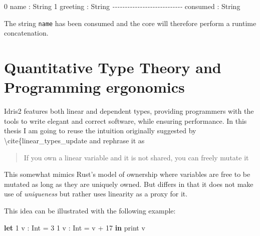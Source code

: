 \documentclass[
]{article}
\newenvironment{Shaded}{}{}
\newcommand{\CommentTok}[1]{\textcolor[rgb]{0.38,0.63,0.69}{\textit{#1}}}
\newcommand{\DataTypeTok}[1]{\textcolor[rgb]{0.56,0.13,0.00}{#1}}
\newcommand{\DecValTok}[1]{\textcolor[rgb]{0.25,0.63,0.44}{#1}}
\newcommand{\FunctionTok}[1]{\textcolor[rgb]{0.02,0.16,0.49}{#1}}
\newcommand{\KeywordTok}[1]{\textcolor[rgb]{0.00,0.44,0.13}{\textbf{#1}}}
\newcommand{\NormalTok}[1]{#1}
\newcommand{\OperatorTok}[1]{\textcolor[rgb]{0.40,0.40,0.40}{#1}}
\newcommand{\OtherTok}[1]{\textcolor[rgb]{0.00,0.44,0.13}{#1}}
\begin{document}
\begin{Shaded}
\begin{Highlighting}[]
\DecValTok{0}\NormalTok{ name }\OperatorTok{:} \DataTypeTok{String}
\DecValTok{1}\NormalTok{ greeting }\OperatorTok{:} \DataTypeTok{String}
\CommentTok{{-}{-}{-}{-}{-}{-}{-}{-}{-}{-}{-}{-}{-}{-}{-}{-}{-}{-}{-}{-}{-}{-}{-}{-}{-}{-}{-}{-}}
\NormalTok{consumed }\OperatorTok{:} \DataTypeTok{String}
\end{Highlighting}
\end{Shaded}

The string \texttt{name} has been consumed and the core will therefore
perform a runtime concatenation.

\newpage

\hypertarget{quantitative-type-theory-and-programming-ergonomics}{%
\section{Quantitative Type Theory and Programming
ergonomics}\label{quantitative-type-theory-and-programming-ergonomics}}

Idris2 features both linear and dependent types, providing programmers
with the tools to write elegant and correct software\cite{dtt_edwin},
while ensuring performance. In this thesis I am going to reuse the
intuition originally suggested by
\cite{once_upon_a_type}\cite{linear_update}\textbackslash cite\{linear\_types\_update\cite{linear_use}
and rephrase it as

\begin{quote}
If you own a linear variable and it is not shared, you can freely mutate
it
\end{quote}

This somewhat mimics Rust's \cite{rust} model of ownership where
variables are free to be mutated as long as they are uniquely owned. But
differs in that it does not make use of \emph{uniqueness} but rather
uses linearity as a proxy for it.

This idea can be illustrated with the following example:

\begin{Shaded}
\begin{Highlighting}[]
\KeywordTok{let} \DecValTok{1}\NormalTok{ v }\OtherTok{:} \DataTypeTok{Int} \FunctionTok{=} \DecValTok{3}
    \DecValTok{1}\NormalTok{ v\textquotesingle{} }\OtherTok{:} \DataTypeTok{Int} \FunctionTok{=}\NormalTok{ v }\FunctionTok{+} \DecValTok{17}
 \KeywordTok{in}\NormalTok{ print v\textquotesingle{}}
\end{Highlighting}
\end{Shaded}
\end{document}
